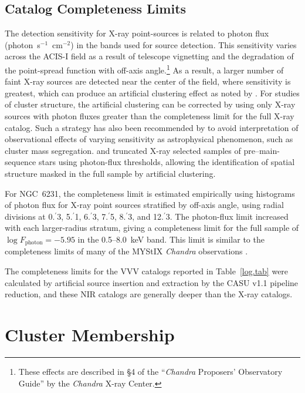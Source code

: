 \documentclass[twocolumn,tighten]{aastex61}
\begin{document}
\subsection{Catalog Completeness Limits \label{completeness.sec}}

The detection sensitivity for X-ray point-sources is related to photon flux (photon~s$^{-1}$~cm$^{-2}$) in the bands used for source detection. This sensitivity varies across the ACIS-I field as a result of telescope vignetting and the degradation of the point-spread function with off-axis angle.\footnote{These effects are described in \S4 of the ``{\it Chandra} Proposers' Observatory Guide'' by the {\it Chandra} X-ray Center.}  As a result, a larger number of faint X-ray sources are detected near the center of the field, where sensitivity is greatest, which can produce an artificial clustering effect as noted by \citet{2011ApJS..194....2B}. For studies of cluster structure, the artificial clustering can be corrected by using only X-ray sources with photon fluxes greater than the completeness limit for the full X-ray catalog. Such a strategy has also been recommended by \citet{2009A&A...495..147A} to avoid interpretation of observational effects of varying sensitivity as astrophysical phenomenon, such as cluster mass segregation. \citet{2011ApJS..194....9F} and \citet{2014ApJ...787..107K,2015ApJ...802...60K,2015ApJ...812..131K} truncated X-ray selected samples of pre--main-sequence stars using photon-flux thresholds, allowing the identification of spatial structure masked in the full sample by artificial clustering. 

For NGC~6231, the completeness limit is estimated empirically using histograms of photon flux for X-ray point sources stratified by off-axis angle, using radial divisions at 0.$\!^\prime$3, 5.$\!^\prime$1, 6.$\!^\prime$3, 7.$\!^\prime$5, 8.$\!^\prime$3, and 12.$\!^\prime$3. The photon-flux limit increased with each larger-radius stratum, giving a completeness limit for the full sample of $\log F_\mathrm{photon}=-5.95$ in the 0.5--8.0~keV band. This limit is similar to the completeness limits of many of the MYStIX {\it Chandra} observations \citep{2013ApJS..209...27K}.

The completeness limits for the VVV catalogs reported in Table~\ref{log.tab} were calculated by artificial source insertion and extraction by the CASU v1.1 pipeline reduction, and these NIR catalogs are generally deeper than the X-ray catalogs. 

\section{Cluster Membership \label{members.sec}}
\end{document}
